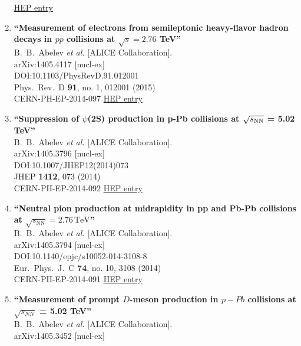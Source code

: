 \begin{enumerate}
\href{http://inspirehep.net/record/1296861}{HEP entry}
\item%
{\bf ``Measurement of electrons from semileptonic heavy-flavor hadron decays in $pp$ collisions at $\sqrt{s} = 2.76$ TeV''}
  \\{}B.~B.~Abelev {\it et al.} [ALICE Collaboration].
  \\{}arXiv:1405.4117 [nucl-ex]
  \\{}DOI:10.1103/PhysRevD.91.012001
  \\{}Phys.\ Rev.\ D {\bf 91}, no. 1, 012001 (2015)
  \\{}CERN-PH-EP-2014-097
\href{http://inspirehep.net/record/1296860}{HEP entry}
\item%
{\bf ``Suppression of $\psi$(2S) production in p-Pb collisions at $\sqrt{s_{\rm NN}}$ = 5.02 TeV''}
  \\{}B.~B.~Abelev {\it et al.} [ALICE Collaboration].
  \\{}arXiv:1405.3796 [nucl-ex]
  \\{}DOI:10.1007/JHEP12(2014)073
  \\{}JHEP {\bf 1412}, 073 (2014)
  \\{}CERN-PH-EP-2014-092
\href{http://inspirehep.net/record/1296307}{HEP entry}
\item%
{\bf ``Neutral pion production at midrapidity in pp and Pb-Pb collisions at $\sqrt{s_{{\mathrm {NN}}}}= 2.76\,{\mathrm {TeV}}$''}
  \\{}B.~B.~Abelev {\it et al.} [ALICE Collaboration].
  \\{}arXiv:1405.3794 [nucl-ex]
  \\{}DOI:10.1140/epjc/s10052-014-3108-8
  \\{}Eur.\ Phys.\ J.\ C {\bf 74}, no. 10, 3108 (2014)
  \\{}CERN-PH-EP-2014-091
\href{http://inspirehep.net/record/1296306}{HEP entry}
\item%
{\bf ``Measurement of prompt $D$-meson production in $p-Pb$ collisions at $\sqrt{s_{NN}}$ = 5.02 TeV''}
  \\{}B.~B.~Abelev {\it et al.} [ALICE Collaboration].
  \\{}arXiv:1405.3452 [nucl-ex]

\end{enumerate}
